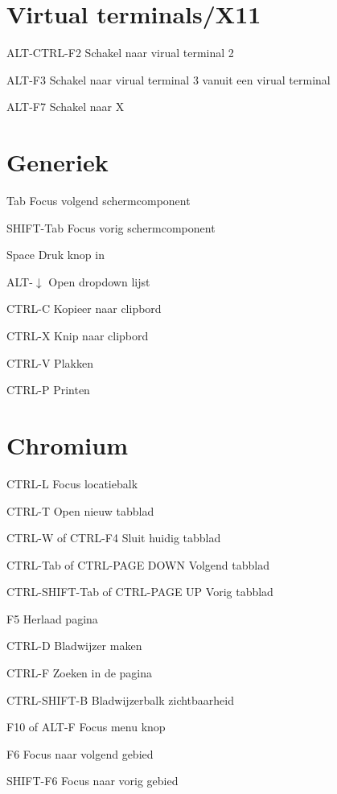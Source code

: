 \documentclass[10pt]{article}
\begin{document}
\begin{multicols}{3}
	\section{Virtual terminals/X11}
	\begin{ttdesc}[labelwidth=\widthof{\texttt{SHIFT+Tab}}]
	\item[ALT-CTRL-F2] Schakel naar virual terminal 2
	\item[ALT-F3] Schakel naar virual terminal 3 vanuit een virual terminal
	\item[ALT-F7] Schakel naar X
	\end{ttdesc}
	\section{Generiek}
	\begin{ttdesc}[labelwidth=\widthof{\texttt{SHIFT+Tab}}]
	\item[Tab] Focus volgend schermcomponent
	\item[SHIFT-Tab] Focus vorig schermcomponent
	\item[Space] Druk knop in
	\item[ALT-$\downarrow$] Open dropdown lijst
	\item[CTRL-C] Kopieer naar clipbord
	\item[CTRL-X] Knip naar clipbord
	\item[CTRL-V] Plakken
	\item[CTRL-P] Printen
	\end{ttdesc}
	\section{Chromium}
	\begin{ttdesc}[labelwidth=\widthof{\texttt{CTRL+SHIFT-Tab}}]
	\item[CTRL-L] Focus locatiebalk
	\item[CTRL-T] Open nieuw tabblad
	\item[CTRL-W of CTRL-F4] Sluit huidig tabblad
	\item[CTRL-Tab of CTRL-PAGE DOWN] Volgend tabblad
	\item[CTRL-SHIFT-Tab of CTRL-PAGE UP] Vorig tabblad
	\item[F5] Herlaad pagina
	\item[CTRL-D] Bladwijzer maken
	\item[CTRL-F] Zoeken in de pagina
	\item[CTRL-SHIFT-B] Bladwijzerbalk zichtbaarheid
	\item[F10 of ALT-F] Focus menu knop
	\item[F6] Focus naar volgend gebied
	\item[SHIFT-F6] Focus naar vorig gebied
	\end{ttdesc}

\end{multicols}
\end{document}
